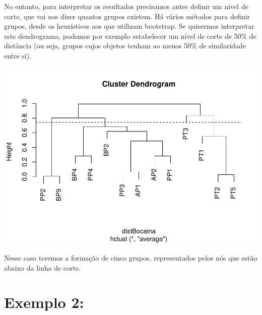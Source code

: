 \documentclass[
]{book}
\newenvironment{Shaded}{\begin{snugshade}}{\end{snugshade}}
\newcommand{\DataTypeTok}[1]{\textcolor[rgb]{0.13,0.29,0.53}{#1}}
\newcommand{\DecValTok}[1]{\textcolor[rgb]{0.00,0.00,0.81}{#1}}
\newcommand{\KeywordTok}[1]{\textcolor[rgb]{0.13,0.29,0.53}{\textbf{#1}}}
\newcommand{\NormalTok}[1]{#1}
\newcommand{\OperatorTok}[1]{\textcolor[rgb]{0.81,0.36,0.00}{\textbf{#1}}}
\newcommand{\StringTok}[1]{\textcolor[rgb]{0.31,0.60,0.02}{#1}}
\begin{document}
No entanto, para interpretar os resultados precisamos antes definir um nível de corte, que vai nos dizer quantos grupos existem. Há vários métodos para definir grupos, desde os heurísticos aos que utilizam bootstrap. Se quisermos interpretar este dendrograma, podemos por exemplo estabelecer um nível de corte de 50\% de distância (ou seja, grupos cujos objetos tenham ao menos 50\% de similaridade entre si).

\begin{Shaded}
\end{Shaded}

\includegraphics{livro_r_ecologia_files/figure-latex/unnamed-chunk-27-1.pdf}

Nesse caso teremos a formação de cinco grupos, representados pelos nós que estão abaixo da linha de corte.

\hypertarget{exemplo-2}{%
\section{Exemplo 2:}\label{exemplo-2}}
\end{document}
